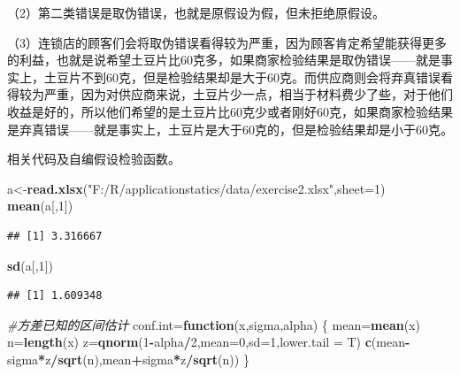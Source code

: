 \documentclass[]{article}
\newenvironment{Shaded}{\begin{snugshade}}{\end{snugshade}}
\newcommand{\KeywordTok}[1]{\textcolor[rgb]{0.13,0.29,0.53}{\textbf{#1}}}
\newcommand{\DataTypeTok}[1]{\textcolor[rgb]{0.13,0.29,0.53}{#1}}
\newcommand{\DecValTok}[1]{\textcolor[rgb]{0.00,0.00,0.81}{#1}}
\newcommand{\StringTok}[1]{\textcolor[rgb]{0.31,0.60,0.02}{#1}}
\newcommand{\CommentTok}[1]{\textcolor[rgb]{0.56,0.35,0.01}{\textit{#1}}}
\newcommand{\ControlFlowTok}[1]{\textcolor[rgb]{0.13,0.29,0.53}{\textbf{#1}}}
\newcommand{\OperatorTok}[1]{\textcolor[rgb]{0.81,0.36,0.00}{\textbf{#1}}}
\newcommand{\NormalTok}[1]{#1}
\begin{document}
（2）第二类错误是取伪错误，也就是原假设为假，但未拒绝原假设。

（3）连锁店的顾客们会将取伪错误看得较为严重，因为顾客肯定希望能获得更多的利益，也就是说希望土豆片比60克多，如果商家检验结果是取伪错误------就是事实上，土豆片不到60克，但是检验结果却是大于60克。而供应商则会将弃真错误看得较为严重，因为对供应商来说，土豆片少一点，相当于材料费少了些，对于他们收益是好的，所以他们希望的是土豆片比60克少或者刚好60克，如果商家检验结果是弃真错误------就是事实上，土豆片是大于60克的，但是检验结果却是小于60克。

相关代码及自编假设检验函数。

\begin{Shaded}
\begin{Highlighting}[]
\NormalTok{a<-}\KeywordTok{read.xlsx}\NormalTok{(}\StringTok{"F:/R/applicationstatics/data/exercise2.xlsx"}\NormalTok{,}\DataTypeTok{sheet=}\DecValTok{1}\NormalTok{)}
\KeywordTok{mean}\NormalTok{(a[,}\DecValTok{1}\NormalTok{])}
\end{Highlighting}
\end{Shaded}

\begin{verbatim}
## [1] 3.316667
\end{verbatim}

\begin{Shaded}
\begin{Highlighting}[]
\KeywordTok{sd}\NormalTok{(a[,}\DecValTok{1}\NormalTok{])}
\end{Highlighting}
\end{Shaded}

\begin{verbatim}
## [1] 1.609348
\end{verbatim}

\begin{Shaded}
\begin{Highlighting}[]
\CommentTok{#方差已知的区间估计}
\NormalTok{conf.int=}\ControlFlowTok{function}\NormalTok{(x,sigma,alpha) \{}
\NormalTok{  mean=}\KeywordTok{mean}\NormalTok{(x)}
\NormalTok{  n=}\KeywordTok{length}\NormalTok{(x)}
\NormalTok{  z=}\KeywordTok{qnorm}\NormalTok{(}\DecValTok{1}\OperatorTok{-}\NormalTok{alpha}\OperatorTok{/}\DecValTok{2}\NormalTok{,}\DataTypeTok{mean=}\DecValTok{0}\NormalTok{,}\DataTypeTok{sd=}\DecValTok{1}\NormalTok{,}\DataTypeTok{lower.tail =}\NormalTok{ T)}
  \KeywordTok{c}\NormalTok{(mean}\OperatorTok{-}\NormalTok{sigma}\OperatorTok{*}\NormalTok{z}\OperatorTok{/}\KeywordTok{sqrt}\NormalTok{(n),mean}\OperatorTok{+}\NormalTok{sigma}\OperatorTok{*}\NormalTok{z}\OperatorTok{/}\KeywordTok{sqrt}\NormalTok{(n))}
\NormalTok{\}}
\end{Highlighting}
\end{Shaded}
\end{document}
